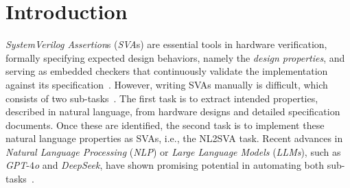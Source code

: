 \section{Introduction}
\label{sec:introduction}
\textit{SystemVerilog Assertion}s (\textit{SVA}s) are essential tools in hardware verification, formally specifying expected design behaviors, namely the \textit{design properties}, and serving as embedded checkers that continuously validate the implementation against its specification~\cite{Witharana22,SystemVerilog18}.
However, writing SVAs manually is difficult, which consists of two sub-tasks~\cite{Vasudevan10,Witharana23}.
The first task is to extract intended properties, described in natural language, from hardware designs and detailed specification documents. 
Once these are identified, the second task is to implement these natural language properties as SVAs, i.e., the NL2SVA task. 
Recent advances in \textit{Natural Language Processing} (\textit{NLP}) or \textit{Large Language Models} (\textit{LLMs}), such as \textit{GPT}-$4$\textit{o} and \textit{DeepSeek}, have shown promising potential in automating both sub-tasks~\cite{Radu24,Mali24}.


